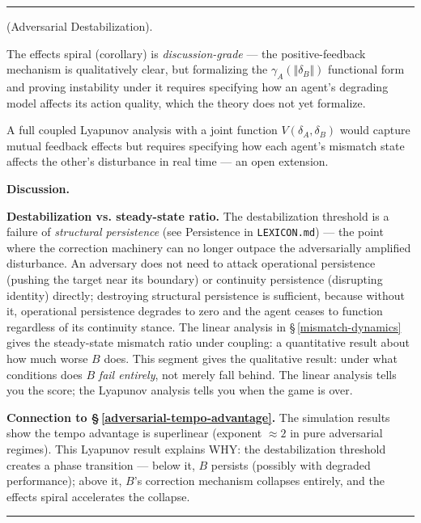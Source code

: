 \documentclass[11pt,oneside]{article}
\newcounter{claim}[section]
\renewcommand{\theclaim}{\thesection.\arabic{claim}}
\newenvironment{segment}[2]{%
  \refstepcounter{claim}%
  \bigskip\noindent\hrule\smallskip
  \noindent{\bfseries #1~\theclaim}\enskip(#2).\par\smallskip
  \noindent\ignorespaces
}{%
  \par\smallskip\noindent\hrule\bigskip
}
\newenvironment{proposition}[1][]{\begin{segment}{Proposition}{#1}}{\end{segment}}
\begin{document}
\begin{proposition}[Adversarial Destabilization]
The effects spiral (corollary) is \textit{discussion-grade} — the positive-feedback mechanism is qualitatively clear, but formalizing the $\gamma_A(\Vert\delta_B\Vert)$ functional form and proving instability under it requires specifying how an agent's degrading model affects its action quality, which the theory does not yet formalize.

A full coupled Lyapunov analysis with a joint function $V(\delta_A, \delta_B)$ would capture mutual feedback effects but requires specifying how each agent's mismatch state affects the other's disturbance in real time — an open extension.


\medskip\noindent\textbf{Discussion.}


\textbf{Destabilization vs. steady-state ratio.} The destabilization threshold is a failure of \textit{structural persistence} (see Persistence in \texttt{LEXICON.md}) — the point where the correction machinery can no longer outpace the adversarially amplified disturbance. An adversary does not need to attack operational persistence (pushing the target near its boundary) or continuity persistence (disrupting identity) directly; destroying structural persistence is sufficient, because without it, operational persistence degrades to zero and the agent ceases to function regardless of its continuity stance. The linear analysis in \S\,\ref{mismatch-dynamics} gives the steady-state mismatch ratio under coupling: a quantitative result about how much worse $B$ does. This segment gives the qualitative result: under what conditions does $B$ \textit{fail entirely}, not merely fall behind. The linear analysis tells you the score; the Lyapunov analysis tells you when the game is over.

\textbf{Connection to \S\,\ref{adversarial-tempo-advantage}.} The simulation results show the tempo advantage is superlinear (exponent $\approx 2$ in pure adversarial regimes). This Lyapunov result explains WHY: the destabilization threshold creates a phase transition — below it, $B$ persists (possibly with degraded performance); above it, $B$'s correction mechanism collapses entirely, and the effects spiral accelerates the collapse.

\end{proposition}
\end{document}

